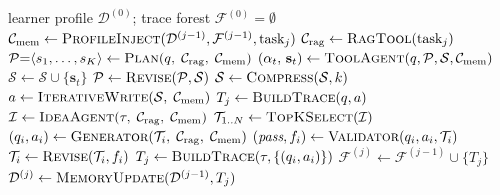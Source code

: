 \begin{algorithm}[t]
\caption{Closed-Loop Personalized Tutoring}\label{alg:loop}
\small
\begin{algorithmic}[1]
\Require learner profile $\mathcal{D}^{(0)}$;\; trace forest $\mathcal{F}^{(0)} = \emptyset$
    \State $\mathcal{C}_{\text{mem}} \gets \Call{ProfileInject}{\mathcal{D}^{(j{-}1)}, \mathcal{F}^{(j{-}1)}, \text{task}_j}$
    \State $\mathcal{C}_{\text{rag}} \gets \textsc{RagTool}(\text{task}_j)$
        \State $\mathcal{P}{=}\langle s_1,\dots,s_K\rangle \gets \Call{Plan}{q,\;\mathcal{C}_{\text{rag}},\;\mathcal{C}_{\text{mem}}}$ 
         
                \State $(\alpha_t,\, \mathbf{s}_t) \gets \Call{ToolAgent}{q, \mathcal{P}, \mathcal{S}, \mathcal{C}_{\text{mem}}}$
                \State $\mathcal{S} \gets \mathcal{S} \cup \{\mathbf{s}_t\}$
                    \State $\mathcal{P} \gets \Call{Revise}{\mathcal{P}, \mathcal{S}}$
                \EndIf
            \EndWhile
            \State $\mathcal{S} \gets \Call{Compress}{\mathcal{S}, k}$
        \EndFor
        \State $a \gets \Call{IterativeWrite}{\mathcal{S},\;\mathcal{C}_{\text{mem}}}$ 
        \State $T_j \gets \Call{BuildTrace}{q, a}$
    \Else {}
        \State $\mathcal{I} \gets \Call{IdeaAgent}{\tau,\;\mathcal{C}_{\text{rag}},\;\mathcal{C}_{\text{mem}}}$ 
        \State $\mathcal{T}_{1..N} \gets \Call{TopKSelect}{\mathcal{I}}$
         
            \Repeat
                \State $(q_i, a_i) \gets \Call{Generator}{\mathcal{T}_i,\;\mathcal{C}_{\text{rag}},\;\mathcal{C}_{\text{mem}}}$
                \State $(\textit{pass}, f_i) \gets \Call{Validator}{q_i, a_i, \mathcal{T}_i}$
                 $\mathcal{T}_i \gets \Call{Revise}{\mathcal{T}_i, f_i}$
                \EndIf
        \EndFor
        \State $T_j \gets \Call{BuildTrace}{\tau, \{(q_i, a_i)\}}$
    \EndIf
    \State $\mathcal{F}^{(j)} \gets \mathcal{F}^{(j{-}1)} \cup \{T_j\}$
    \State $\mathcal{D}^{(j)} \gets \Call{MemoryUpdate}{\mathcal{D}^{(j{-}1)}, T_j}$ 
\EndFor
\end{algorithmic}
\end{algorithm}

